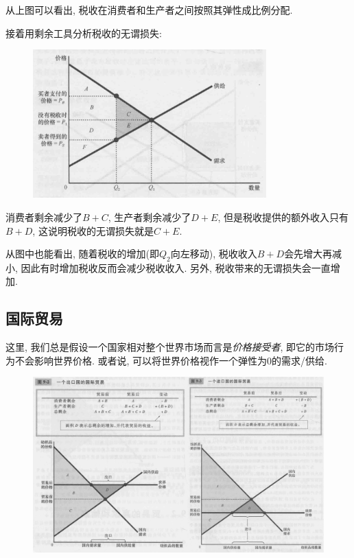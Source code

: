 从上图可以看出, 税收在消费者和生产者之间按照其弹性成比例分配. 

接着用剩余工具分析税收的无谓损失: 

\begin{figure}[H]
	\centering
	\includegraphics[width=9cm]{attachment/Fig8_3.png}
\end{figure}

消费者剩余减少了$B+C$, 生产者剩余减少了$D+E$, 但是税收提供的额外收入只有$B+D$, 这说明税收的无谓损失就是$C+E$. 

从图中也能看出, 随着税收的增加(即$Q_2$向左移动), 税收收入$B+D$会先增大再减小, 因此有时增加税收反而会减少税收收入. 另外, 税收带来的无谓损失会一直增加. 

\subsection{国际贸易}

这里, 我们总是假设一个国家相对整个世界市场而言是\textit{价格接受者}, 即它的市场行为不会影响世界价格. 或者说, 可以将世界价格视作一个弹性为$0$的需求/供给. 

\begin{figure}[H]
	\centering
	\includegraphics[width=18cm]{attachment/Fig9_2,3.png}
\end{figure}

